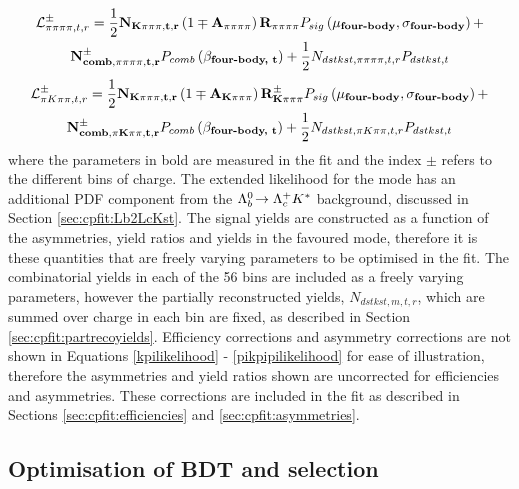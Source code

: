 \begin{multline}
\mathcal{L}_{\pi\pi\pi\pi, t, r}^{\pm} = \frac{1}{2}\mathbf{N_{K\pi\pi\pi, t, r}}\left(1 \mp \mathbf{A_{\pi\pi\pi\pi}}\right)\mathbf{R_{\pi\pi\pi\pi}} P_{sig}\left(\mathbf{\mu_\text{\textbf{four-body}}},\mathbf{\sigma_\text{\textbf{four-body}}}\right) + \\ \mathbf{N_{comb, \pi\pi\pi\pi, t, r}^{\pm}}P_{comb}\left(\mathbf{\beta_\text{\textbf{four-body, t}}}\right) + \frac{1}{2}N_{dstkst, \pi\pi\pi\pi, t, r}P_{dstkst, t}
\end{multline}
\begin{multline}
\mathcal{L}_{\pi K\pi\pi, t, r}^{\pm} = \frac{1}{2}\mathbf{N_{K\pi\pi\pi, t, r}}\left(1 \mp \mathbf{A_{K\pi\pi\pi}}\right)\mathbf{R_{K\pi\pi\pi}^{\pm}} P_{sig}\left(\mathbf{\mu_\text{\textbf{four-body}}},\mathbf{\sigma_\text{\textbf{four-body}}}\right) + \\ \mathbf{N_{comb, \pi K\pi\pi, t, r}^{\pm}}P_{comb}\left(\mathbf{\beta_\text{\textbf{four-body, t}}}\right) + \frac{1}{2}N_{dstkst, \pi K\pi\pi, t, r}P_{dstkst, t}
\label{pikpipilikelihood}
\end{multline}
where the parameters in bold are measured in the fit and the index $\pm$ refers to the different bins of \B charge. The extended likelihood for the \kk mode has an additional PDF component from the ${{\Lambda}^0_{b}}\!\rightarrow {\ensuremath{{\Lambda}^+_{c}}}{\ensuremath{{K}^*}}$ background, discussed in Section \ref{sec:cpfit:Lb2LcKst}. The signal yields are constructed as a function of the asymmetries, yield ratios and yields in the favoured mode, therefore it is these quantities that are freely varying parameters to be optimised in the \CP fit. The combinatorial yields in each of the 56 bins are included as a freely varying parameters, however the partially reconstructed yields, $N_{dstkst, m, t, r}$, which are summed over charge in each bin are fixed, as described in Section \ref{sec:cpfit:partrecoyields}. Efficiency corrections and asymmetry corrections are not shown in Equations \ref{kpilikelihood} - \ref{pikpipilikelihood} for ease of illustration, therefore the asymmetries and yield ratios shown are uncorrected for efficiencies and asymmetries. These corrections are included in the \CP fit as described in Sections \ref{sec:cpfit:efficiencies} and \ref{sec:cpfit:asymmetries}.

\subsection{Optimisation of BDT and \Kstar selection}
\label{sec:cpfit:optimisation}

